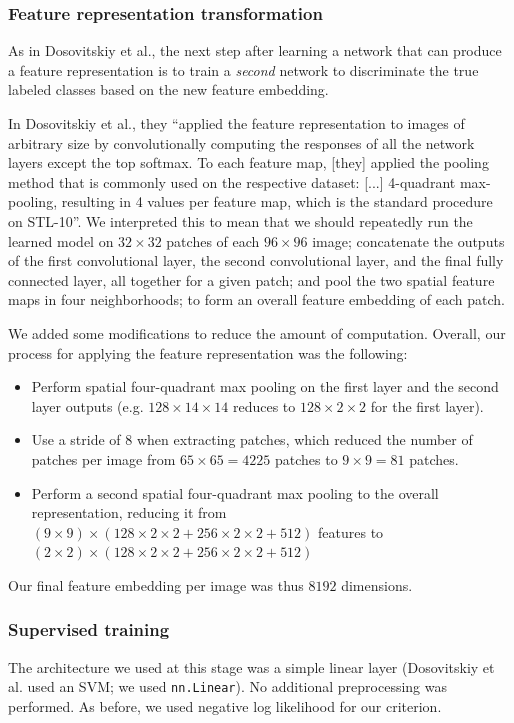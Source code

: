 \documentclass{article} %
\newenvironment{itemizedense}{
\begin{itemize}
  \setlength{\itemsep}{1pt}
  \setlength{\parskip}{0pt}
  \setlength{\parsep}{0pt}
}{\end{itemize}}
\begin{document}
\subsubsection{Feature representation transformation}

As in Dosovitskiy et al., the next step after learning a network that can produce a feature representation is to train a \emph{second} network to discriminate the true labeled classes based on the new feature embedding.

In Dosovitskiy et al., they ``applied the feature representation to images of arbitrary size by convolutionally computing the
responses of all the network layers except the top softmax. To each feature map, [they] applied the pooling method that is commonly used on the respective dataset: [...] 4-quadrant max-pooling, resulting in 4 values per feature map, which is the standard procedure on STL-10''. We interpreted this to mean that we should repeatedly run the learned model on $32\times32$ patches of each $96\times96$ image; concatenate the outputs of the first convolutional layer, the second convolutional layer, and the final fully connected layer, all together for a given patch; and pool the two spatial feature maps in four neighborhoods; to form an overall feature embedding of each patch.

We added some modifications to reduce the amount of computation. Overall, our process for applying the feature representation was the following:
\begin{itemizedense}
\item Perform spatial four-quadrant max pooling on the first layer and the second layer outputs (e.g. $128 \times 14 \times 14$ reduces to $128 \times 2 \times 2$ for the first layer).
\item Use a stride of 8 when extracting patches, which reduced the number of patches per image from $65\times65=4225$ patches to $9 \times 9 = 81$ patches.
\item Perform a second spatial four-quadrant max pooling to the overall representation, reducing it from $(9\times9) \times (128 \times 2 \times 2 + 256 \times 2 \times 2 + 512)$ features to $(2\times2) \times (128 \times 2 \times 2 + 256 \times 2 \times 2 + 512)$
\end{itemizedense}

Our final feature embedding per image was thus $8192$ dimensions.

\subsubsection{Supervised training}
The architecture we used at this stage was a simple linear layer (Dosovitskiy et al. used an SVM; we used \texttt{nn.Linear}). No additional preprocessing was performed. As before, we used negative log likelihood for our criterion.
\end{document}
